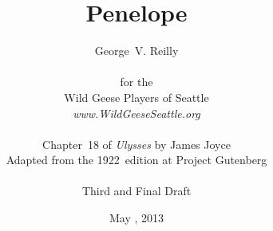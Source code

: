 



\title{\Huge Penelope}
\author{George~V. Reilly\\
\\
{\small for the}\\
Wild Geese Players of Seattle\\
{\emph{www.WildGeeseSeattle.org}}\\
\\
{\small Chapter~18 of \emph{Ulysses} by James Joyce}\\
{\small Adapted from the 1922~edition at Project Gutenberg}
\\
\\
{\small Third and Final Draft}}
\date{May , 2013}
\raggedbottom



\maketitle
\thispagestyle{empty}
\pagebreak

